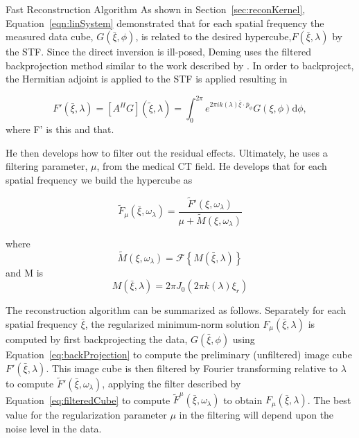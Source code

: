 Fast Reconstruction Algorithm
As shown in Section~\ref{sec:reconKernel}, Equation~\ref{eqn:linSystem} demonstrated that for each spatial frequency the measured data cube, $G(\bar{\xi},\phi)$, is related to the desired hypercube,$F(\bar{\xi},\lambda)$ by the \ac{STF}. Since the direct inversion is ill-posed, Deming uses the filtered backprojection method similar to the work described by \cite{Bernhardt}. In order to backproject, the Hermitian adjoint is applied to the \ac{STF} is applied resulting in

\begin{equation}
\label{eq:backProjection}
F'(\bar{\xi},\lambda) = [A^{H}G](\tilde{\xi},\lambda)=\int_{0}^{2 \pi} e^{2 \pi i k(\lambda)\bar{\xi}\cdot \bar{p}_\phi} G(\xi,\phi) \mathrm{d}\phi,
\end{equation}
where F' is this and that.

He then develops how to filter out the residual effects. Ultimately, he uses a filtering parameter, $\mu$, from the medical CT field. He develops that for each spatial frequency we build the hypercube as

\begin{equation}
\label{eq:filteredCube}
\tilde{F}_\mu(\bar{\xi},\omega_\lambda) = \frac{\tilde{F}'(\xi,\omega_\lambda)}{\mu+\tilde{M}(\xi,\omega_\lambda)}
\end{equation}

where 
\begin{equation}
\label{eq:filter}
\tilde{M}(\xi,\omega_\lambda) = \mathcal{F}\left\{M(\bar{\xi},\lambda)\right\}
\end{equation}
and M is
\begin{equation}
\label{eq:Bessel}
M(\bar{\xi},\lambda)=2 \pi J_0 (2 \pi k(\lambda) \xi_r)
\end{equation}

The reconstruction algorithm can be summarized as follows. Separately for each spatial frequency $\bar{\xi}$, the regularized minimum-norm solution $F_{\mu}(\bar{\xi},\lambda)$ is computed by first backprojecting the data, $G(\bar{\xi},\phi)$ using Equation~\ref{eq:backProjection} to compute the preliminary (unfiltered) image cube $F'(\bar{\xi},\lambda)$. This image cube is then filtered by Fourier transforming relative to $\lambda$ to compute $\tilde{F}'(\bar{\xi},\omega_\lambda)$, applying the filter described by Equation~\ref{eq:filteredCube} to compute $\tilde{F}^{\mu}(\bar{\xi},\omega_\lambda)$ to obtain $F_{\mu}(\bar{\xi},\lambda)$. The best value for the regularization parameter $\mu$ in the filtering will depend upon the noise level in the data.

